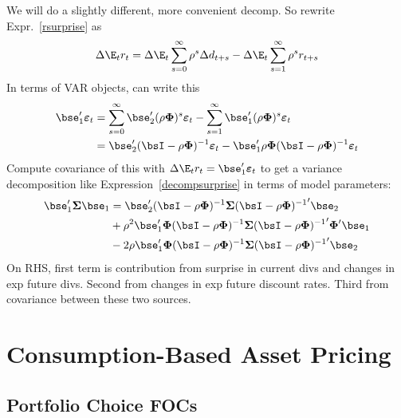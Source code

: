 \documentclass[12pt]{article}
\theoremstyle{plain}
\theoremstyle{definition}
\theoremstyle{remark}
\newcommand{\bsSigma}{\boldsymbol{\Sigma}}
\newcommand{\bsvarepsilon}{\boldsymbol{\varepsilon}}
\newcommand{\bsPhi}{\boldsymbol{\Phi}}
\begin{document}
\begin{multicols*}{2}
We will do a slightly different, more convenient decomp.
So rewrite Expr.~\ref{rsurprise} as
\begin{align*}
  \Delta\E_tr_{t}
  =
  \Delta \E_t \sum_{s=0}^\infty \rho^{s}\Delta d_{t+s}
  - \Delta \E_t \sum_{s=1}^\infty \rho^{s}r_{t+s}
\end{align*}
In terms of VAR objects, can write this
\begin{align*}
  \bse_1'\bsvarepsilon_t
  &=
  \sum_{s=0}^\infty \bse_2'(\rho\bsPhi)^{s}\bsvarepsilon_t
  - \sum_{s=1}^\infty \bse_1'(\rho\bsPhi)^{s}\bsvarepsilon_t
  \\
  &=
  \bse_2'
  (\bsI-\rho\bsPhi)^{-1}
  \bsvarepsilon_t
  -\bse_1'\rho\bsPhi
  (\bsI-\rho\bsPhi)^{-1}
  \bsvarepsilon_t
\end{align*}
Compute covariance of this with
$\Delta\E_tr_t=\bse_1'\bsvarepsilon_t$ to get a variance decomposition
like Expression~\ref{decompsurprise} in terms of model parameters:
\begin{align*}
  \bse_1'\bsSigma\bse_1
  &=
  \bse_2'
  (\bsI-\rho\bsPhi)^{-1}
  \bsSigma
  {(\bsI-\rho\bsPhi)^{-1}}'
  \bse_2
  \\
  &
  +\rho^2\bse_1'\bsPhi
  (\bsI-\rho\bsPhi)^{-1}
  \bsSigma
  {(\bsI-\rho\bsPhi)^{-1}}'
  \bsPhi'\bse_1
  \\
  &
  -
  2\rho
  \bse_1'
  \bsPhi
  (\bsI-\rho\bsPhi)^{-1}
  \bsSigma
  {(\bsI-\rho\bsPhi)^{-1}}'
  \bse_2
\end{align*}
On RHS, first term is contribution from surprise in current divs and
changes in exp future divs.
Second from changes in exp future discount rates.
Third from covariance between these two sources.


\clearpage
\section{Consumption-Based Asset Pricing}

\subsection{Portfolio Choice FOCs}


\end{multicols*}
\end{document}
